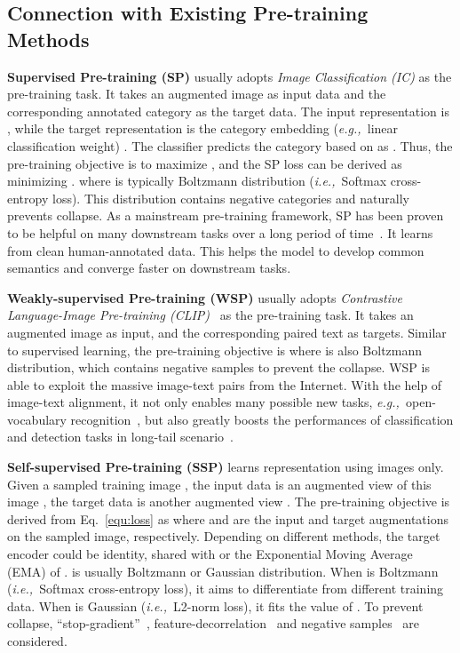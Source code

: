 \documentclass[10pt,twocolumn,letterpaper]{article}
\def\eg{\textit{e.g.,~}}
\def\ie{\textit{i.e.,~}}
\newcommand\smallalign[1]{\begingroup\small
    \setlength{\abovedisplayskip}{0.7em}
    \setlength{\belowdisplayskip}{0.7em}
    \setlength{\abovedisplayshortskip}{0.7em}
    \setlength{\belowdisplayshortskip}{0.7em}
    {#1}\endgroup}
\begin{document}
\subsection{Connection with Existing Pre-training Methods}
\label{sec:conn}

\noindent\textbf{Supervised Pre-training (SP)} usually adopts \textit{Image Classification (IC)} as the pre-training task. It takes an augmented image  as input data and the corresponding annotated category  as the target data. The input representation is , while the target representation is the category embedding (\eg linear classification weight) . The classifier predicts the category based on  as . Thus, the pre-training objective is to maximize , and the SP loss can be derived as minimizing .
\smallalign{}where  is typically Boltzmann distribution (\ie Softmax cross-entropy loss). This distribution contains negative categories and naturally prevents collapse.
As a mainstream pre-training framework, SP has been proven to be helpful on many downstream tasks over a long period of time~\cite{girshick2014rich,carion2020end,chen2017deeplab,xiao2018unified}. It learns from clean human-annotated data. This helps the model to develop common semantics and converge faster on downstream tasks.

\vspace{0.5em}\noindent\textbf{Weakly-supervised Pre-training (WSP)} usually adopts \textit{Contrastive Language-Image Pre-training (CLIP)}~\cite{radford2021learning,jia2021scaling} as the pre-training task. It takes an augmented image  as input, and the corresponding paired text  as targets. Similar to supervised learning, the pre-training objective is
\smallalign{}where  is also Boltzmann distribution, which contains negative samples to prevent the collapse. WSP is able to exploit the massive image-text pairs from the Internet. With the help of image-text alignment, it not only enables many possible new tasks, \eg open-vocabulary recognition~\cite{gu2021open,radford2021learning}, but also greatly boosts the performances of classification and detection tasks in long-tail scenario~\cite{tian2022vl}.

\vspace{0.5em}\noindent\textbf{Self-supervised Pre-training (SSP)} learns representation using images only. Given a sampled training image , the input data is an augmented view of this image , the target data is another augmented view . The pre-training objective is derived from Eq.~\eqref{equ:loss} as
\smallalign{}where  and  are the input and target augmentations on the sampled image, respectively. Depending on different methods, the target encoder  could be identity, shared with  or the Exponential Moving Average (EMA) of .
 is usually Boltzmann or Gaussian distribution. When  is Boltzmann (\ie Softmax cross-entropy loss), it aims to differentiate  from different training data. When  is Gaussian (\ie L2-norm loss), it fits the value of . To prevent collapse, ``stop-gradient''~\cite{grill2020bootstrap}, feature-decorrelation~\cite{zbontar2021barlow} and negative samples~\cite{chen2020simple} are considered.
\end{document}

